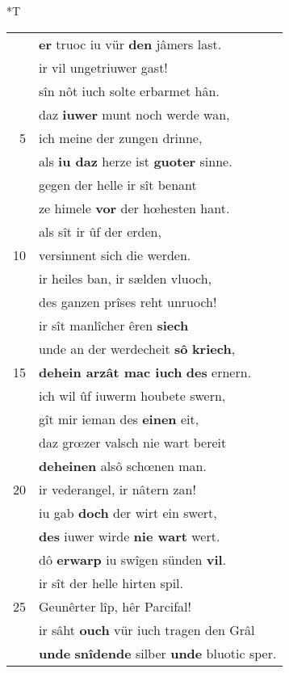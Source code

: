 \documentclass[8pt,a4paper,notitlepage]{article}
\begin{document}
\begin{table}[ht]
\begin{minipage}[t]{0.5\linewidth}
\end{minipage}
\hspace{0.5cm}
\begin{minipage}[t]{0.5\linewidth}
\small
\begin{center}*T
\end{center}
\begin{tabular}{rl}
 & \textbf{er} truoc iu vür \textbf{den} jâmers last.\\ 
 & ir vil ungetriuwer gast!\\ 
 & sîn nôt iuch solte erbarmet hân.\\ 
 & daz \textbf{iuwer} munt noch werde wan,\\ 
5 & ich meine der zungen drinne,\\ 
 & als \textbf{iu daz} herze ist \textbf{guoter} sinne.\\ 
 & gegen der helle ir sît benant\\ 
 & ze himele \textbf{vor} der hœhesten hant.\\ 
 & als sît ir ûf der erden,\\ 
10 & versinnent sich die werden.\\ 
 & ir heiles ban, ir sælden vluoch,\\ 
 & des ganzen prîses reht unruoch!\\ 
 & ir sît manlîcher êren \textbf{siech}\\ 
 & unde an der werdecheit \textbf{sô} \textbf{kriech},\\ 
15 & \textbf{dehein arzât mac iuch} \textbf{des} ernern.\\ 
 & ich wil ûf iuwerm houbete swern,\\ 
 & gît mir ieman des \textbf{einen} eit,\\ 
 & daz grœzer valsch nie wart bereit\\ 
 & \textbf{deheinen} alsô schœnen man.\\ 
20 & ir vederangel, ir nâtern zan!\\ 
 & iu gab \textbf{doch} der wirt ein swert,\\ 
 & \textbf{des} iuwer wirde \textbf{nie wart} wert.\\ 
 & dô \textbf{erwarp} iu swîgen sünden \textbf{vil}.\\ 
 & ir sît der helle hirten spil.\\ 
25 & Geunêrter lîp, hêr Parcifal!\\ 
 & ir sâht \textbf{ouch} vür iuch tragen den Grâl\\ 
 & \textbf{unde} \textbf{snîdende} silber \textbf{unde} bluotic sper.\\ 

\end{tabular}
\end{minipage}
\end{table}
\end{document}
